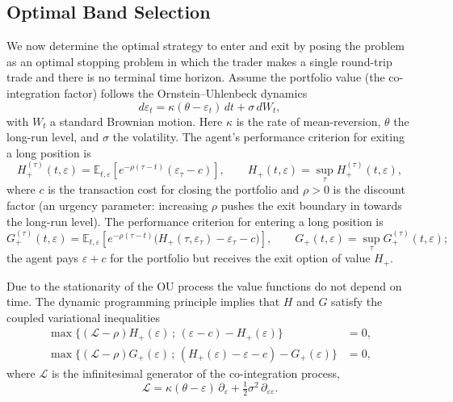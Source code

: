 \documentclass[11pt]{article}
\newcommand{\E}{\mathbb{E}}
\newcommand{\eps}{\varepsilon}
\newcommand{\dd}{\,d}
\DeclareMathOperator*{\supop}{sup}
\begin{document}
\subsection{Optimal Band Selection}\label{sec:optimal}

We now determine the optimal strategy to enter and exit by posing the problem as an optimal stopping
problem in which the trader makes a single round-trip trade and there is no terminal time horizon.
Assume the portfolio value (the co-integration factor) follows the Ornstein--Uhlenbeck dynamics
\begin{equation}
  d\eps_t = \kappa(\theta - \eps_t)\dd t + \sigma \dd W_t,
\end{equation}
with $W_t$ a standard Brownian motion. Here $\kappa$ is the rate of mean-reversion, $\theta$ the
long-run level, and $\sigma$ the volatility. The agent's performance criterion for exiting a long
position is
\begin{equation}
  H_+^{(\tau)}(t,\eps) = \E_{t,\eps}\!\left[ e^{-\rho(\tau - t)}(\eps_\tau - c) \right],
  \qquad
  H_+(t,\eps) = \supop_{\tau} H_+^{(\tau)}(t,\eps),
\end{equation}
where $c$ is the transaction cost for closing the portfolio and $\rho>0$ is the discount factor (an
urgency parameter: increasing $\rho$ pushes the exit boundary in towards the long-run level). The
performance criterion for entering a long position is
\begin{equation}
  G_+^{(\tau)}(t,\eps) = \E_{t,\eps}\!\left[ e^{-\rho(\tau - t)}\big(H_+(\tau,\eps_\tau) - \eps_\tau - c\big) \right],
  \qquad
  G_+(t,\eps) = \supop_{\tau} G_+^{(\tau)}(t,\eps);
\end{equation}
the agent pays $\eps + c$ for the portfolio but receives the exit option of value $H_+$.

Due to the stationarity of the OU process the value functions do not depend on time. The dynamic
programming principle implies that $H$ and $G$ satisfy the coupled variational inequalities
\begin{align}
  \max\big\{(\mathcal{L} - \rho)H_+(\eps)\,;\,(\eps - c) - H_+(\eps)\big\} &= 0,\\
  \max\big\{(\mathcal{L} - \rho)G_+(\eps)\,;\,(H_+(\eps) - \eps - c) - G_+(\eps)\big\} &= 0,
\end{align}
where $\mathcal{L}$ is the infinitesimal generator of the co-integration process,
\begin{equation}
  \mathcal{L} = \kappa(\theta - \eps)\,\partial_\eps + \tfrac{1}{2}\sigma^2\,\partial_{\eps\eps}.
\end{equation}
\end{document}
